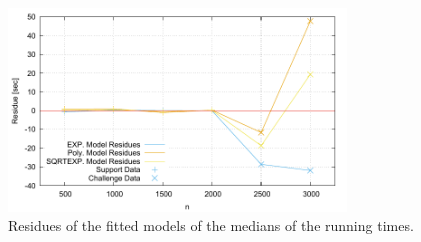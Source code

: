 \begin{figure}[tb]
\noindent \begin{centering}
\includegraphics[width=0.8\textwidth]{fittedResidues}
\par\end{centering}

\caption{\label{fig:Fitted-residues} Residues of the fitted models of the medians
of the running times. }
\end{figure}


